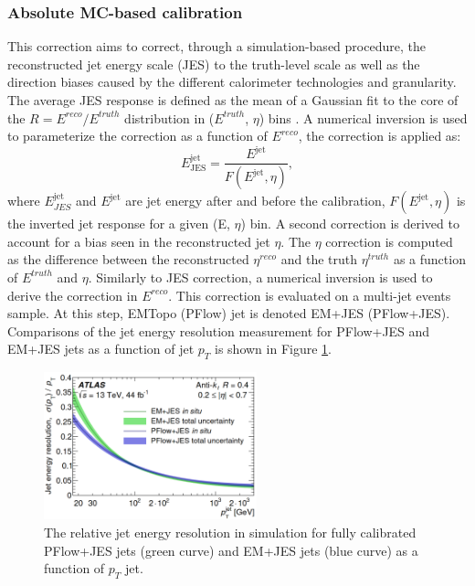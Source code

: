 \subsubsection{Absolute MC-based calibration}
\label{Jet:Cal:chain:JES}
This correction aims to correct, through a simulation-based procedure, the reconstructed jet energy scale (JES) to the truth-level scale as well as the direction biases caused by the different calorimeter technologies and granularity. The average JES response is defined as the mean of a Gaussian fit to the core of the $R=E^{reco}/E^{truth}$ distribution in ($E^{truth}$, $\eta$) bins \cite{Old_JES, Old_JES_Sys}. A numerical inversion is used to parameterize the correction as a function of $E^{reco}$, the correction is applied as: 
\begin{equation}
    E_{\text{JES}}^{\mathrm{jet}}=\frac{E^{\mathrm{jet}}}{F(E^{\mathrm{jet}},\eta)},
\end{equation}
where $E_{JES}^{\mathrm{jet}}$ and $E^{\mathrm{jet}}$ are jet energy after and before the  calibration, $F(E^{\mathrm{jet}}, \eta)$ is the inverted jet response for a given (E, $\eta$) bin. A second correction is derived to account for a bias seen in the reconstructed jet $\eta$. The $\eta$ correction is computed as the difference between the reconstructed $\eta^{reco}$ and the truth $\eta^{truth}$ as a function of $E^{truth}$ and $\eta$. Similarly to JES correction, a numerical inversion is used to derive the correction in $E^{reco}$. This correction is evaluated on a multi-jet events sample. At this step, EMTopo (PFlow) jet is denoted EM+JES (PFlow+JES). Comparisons of the jet energy resolution measurement for PFlow+JES and EM+JES jets as a function of jet $p_T$ is shown in Figure \ref{fig:Jet:Cal:chain:JER}.
\begin{figure}[htbp]
    \centering
    \includegraphics[width=0.55\textwidth]{Ch4/Img/Jet_Resolution_Topo_vs_PFlow.png}
    \caption{The relative jet energy resolution in simulation for fully calibrated PFlow+JES jets (green curve) and EM+JES jets (blue curve) as a function of $p_T$ jet.}
    \label{fig:Jet:Cal:chain:JER}
\end{figure}

